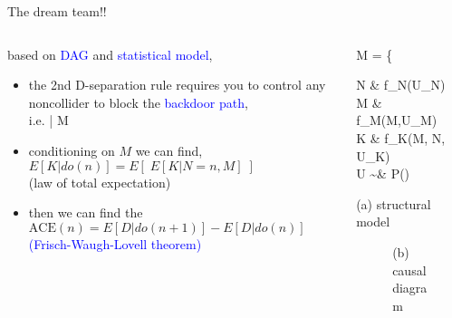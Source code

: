 \begin{frame}
	{The dream team!!}
	\begin{columns}
		\begin{column}{0.5\textwidth}
			based on \textcolor{blue}{DAG} and \textcolor{blue}{statistical model},
			\begin{itemize}
				\item the 2nd D-separation rule requires you to control any noncollider to block the \textcolor{blue}{backdoor path}, \\
				i.e.  \; | M \\
				\item conditioning on $M$ we can find, \\
				{\small $E[K | do(n)] = E[\; E[K | N=n, M] \;]$} \\
				{\small (law of total expectation)}
				\item then we can find the \\
				{\small $\text{ACE}(n) = E[D | do(n+1)] - E[D | do(n)]$ } \\
				{\small \textcolor{blue}{(Frisch-Waugh-Lovell theorem)} }
			\end{itemize}
		\end{column}
		\begin{column}{0.5\textwidth}  
			\begin{equ}
				M = \left\{ \begin{aligned} 
					N \leftarrow & \; f_{N}(U_{N}) \\
					M \leftarrow & \; f_{M}(M,U_{M}) \\
					K \leftarrow & \; f_{K}(M, N, U_{K}) \\
					U \sim & \; P()
				\end{aligned} \right
				\caption*{(a) structural model}
			\end{equ}
			\begin{figure}
				\caption*{(b) causal diagram}
			\end{figure}
		\end{column}
	\end{columns}
\end{frame}
